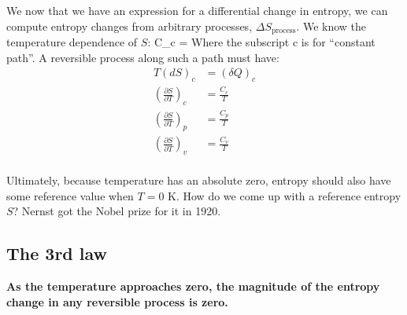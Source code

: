 \documentclass[12pt]{article}
\begin{document}

We now that we have an expression for a differential change in entropy, we can compute  entropy changes from arbitrary processes, $\Delta S_{\text{process}}$.  We know the temperature dependence of $S$:
\beq C_c =  \ceq
Where the subscript c is for ``constant path''. A reversible process along such a path must have:
\begin{align*}
T(dS)_c &= (\delta Q)_c\\
(\frac{\partial S}{\partial T})_c &= \frac{C_c}{T} \\
(\frac{\partial S}{\partial T})_p &= \frac{C_p}{T}\\
(\frac{\partial S}{\partial T})_v &= \frac{C_v}{T}\\
\end{align*}

Ultimately, because temperature has an absolute zero, entropy should also have some reference value when $T=0$ K.  How do we come up with a reference entropy $S$?  Nernst got the Nobel prize for it in 1920.

\subsection{The 3rd law}
\textbf{As the temperature approaches zero, the magnitude of the entropy change in any reversible process is zero.}
\end{document}
